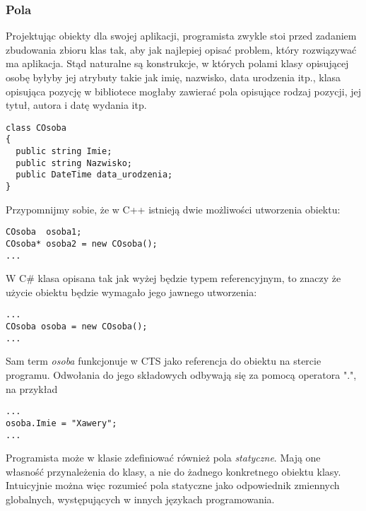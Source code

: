 \subsubsection{Pola}

Projektując obiekty dla swojej aplikacji, programista zwykle stoi przed zadaniem zbudowania zbioru
klas tak, aby jak najlepiej opisać problem, który rozwiązywać ma aplikacja. Stąd naturalne są konstrukcje,
w których polami klasy opisującej osobę byłyby jej atrybuty takie jak imię, nazwisko, data urodzenia itp.,
klasa opisująca pozycję w bibliotece mogłaby zawierać pola opisujące rodzaj pozycji, jej tytuł, autora i datę
wydania itp.

\begin{scriptsize}
\begin{verbatim}
class COsoba
{
  public string Imie;
  public string Nazwisko;
  public DateTime data_urodzenia;
}
\end{verbatim}
\end{scriptsize}

Przypomnijmy sobie, że w C++ istnieją dwie możliwości utworzenia obiektu:
\begin{scriptsize}
\begin{verbatim}
COsoba  osoba1;
COsoba* osoba2 = new COsoba();
...
\end{verbatim}
\end{scriptsize}

W C\# klasa opisana tak jak wyżej będzie typem referencyjnym, to znaczy że użycie obiektu będzie 
wymagało jego jawnego utworzenia:

\begin{scriptsize}
\begin{verbatim}
...
COsoba osoba = new COsoba();
...
\end{verbatim}
\end{scriptsize}

Sam term {\em osoba} funkcjonuje w CTS jako referencja do obiektu na stercie programu. Odwołania do jego
składowych odbywają się za pomocą operatora ".", na przykład

\begin{scriptsize}
\begin{verbatim}
...
osoba.Imie = "Xawery";
...
\end{verbatim}
\end{scriptsize}

Programista może w klasie zdefiniować również pola {\em statyczne}. Mają one własność przynależenia do klasy,
a nie do żadnego konkretnego obiektu klasy. Intuicyjnie można więc rozumieć pola statyczne jako 
odpowiednik zmiennych globalnych, występujących w innych językach programowania.

